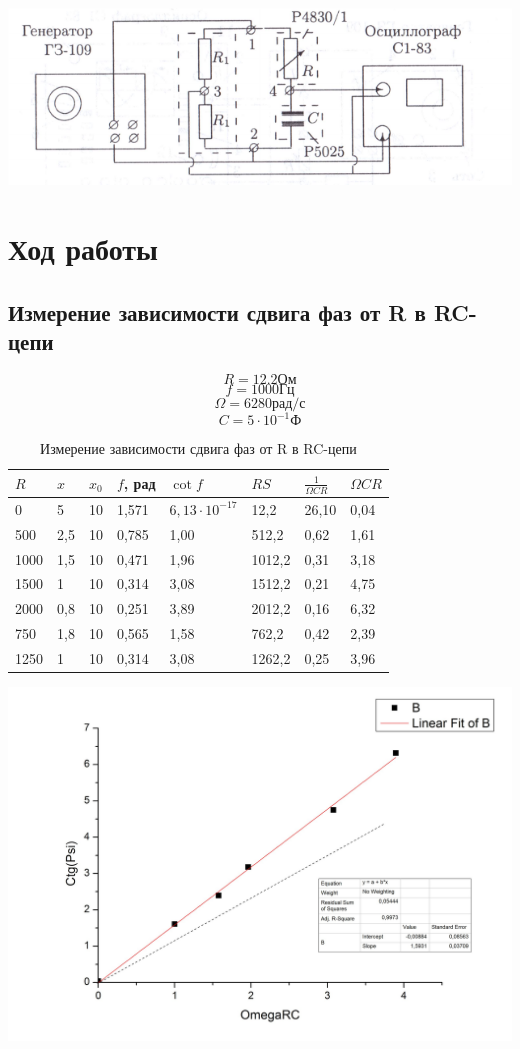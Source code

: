 \documentclass[a4paper,12pt]{article}
\begin{document}
		\includegraphics[width = 0.7\linewidth]{pic4}
	
	\section{Ход работы}
	\subsection{Измерение зависимости сдвига фаз от R в RC-цепи}
	$$ R = 12.2 \text{Ом}$$
	$$ f = 1000 \text{Гц}$$
	$$ \Omega = 6280 \text{рад/с} $$
	$$ C = 5\cdot 10^{-1} \text{Ф}$$
	\begin{table}[h]
		\centering
		\caption{Измерение зависимости сдвига фаз от R в RC-цепи}
		\label{my-label}
		\begin{tabular}{|l|l|l|l|l|l|l|l|}
			\hline
			$R$    & $x$   & $x_0$ & $f$, рад          & $\cot f$    & $RS$     & $\frac{1}{\Omega CR}$ & $\Omega CR$ \\ \hline
			0    & 5   & 10   & 1,571 & $6,13\cdot10^{-17}$ & 12,2   & 26,10  & 0,04 \\ \hline
			500  & 2,5 & 10   & 0,785 & 1,00     & 512,2  & 0,62   & 1,61 \\ \hline
			1000 & 1,5 & 10   & 0,471 & 1,96     & 1012,2 & 0,31   & 3,18 \\ \hline
			1500 & 1   & 10   & 0,314 & 3,08     & 1512,2 & 0,21   & 4,75 \\ \hline
			2000 & 0,8 & 10   & 0,251 & 3,89     & 2012,2 & 0,16   & 6,32 \\ \hline
			750  & 1,8 & 10   & 0,565 & 1,58     & 762,2  & 0,42   & 2,39 \\ \hline
			1250 & 1   & 10   & 0,314 & 3,08     & 1262,2 & 0,25   & 3,96 \\ \hline
			\end{tabular}
	\end{table}
	
	\includegraphics[width = 0.7\linewidth]{graph2}
		
\end{document}
